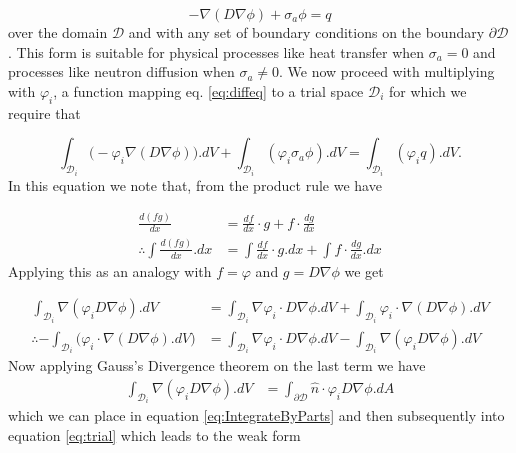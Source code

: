 \documentclass[11pt,letterpaper,titlepage]{article}
\newcommand{\bOmega}{\mathcal{D}}
\numberwithin{equation}{section}
\begin{document}
\begin{equation} \label{eq:diffeq}
-\nabla (D\nabla\phi) + \sigma_a \phi = q
\end{equation}
\newline
\noindent
over the domain $\mathcal{D}$ and with any set of boundary conditions on the boundary $\partial \mathcal{D}$. This form is suitable for physical processes like heat transfer when $\sigma_a = 0$ and processes like neutron diffusion when $\sigma_a \ne 0$.
\newline \newline
We now proceed with multiplying with $\varphi_i$, a function mapping eq. \ref{eq:diffeq} to a trial space $\mathcal{D}_i$ for which we require that

\begin{equation} \label{eq:trial}
\int_{\bOmega_i} \biggr( 
-\varphi_i\nabla (D\nabla\phi) 
\biggr).dV 
+ \int_{\bOmega_i} ( 
\varphi_i\sigma_a  \phi 
  ).dV
= \int_{\bOmega_i} (\varphi_i q).dV.
\end{equation}
\newline
In this equation we note that, from the product rule we have

\begin{align*}
\frac{d(fg)}{dx} &= \frac{df}{dx}\cdot g + f\cdot \frac{dg}{dx} \\
\therefore 
\int \frac{d(fg)}{dx} .dx&= \int \frac{df}{dx}\cdot g.dx + 
\int f\cdot \frac{dg}{dx}.dx
\end{align*}
\newline
Applying this as an analogy with $f=\varphi$ and $g=D\nabla \phi$ we get

\begin{equation}\label{eq:IntegrateByParts}
\begin{aligned}
\int_{\bOmega_i} \nabla( \varphi_i D\nabla \phi) .dV&=
\int_{\bOmega_i} \nabla \varphi_i\cdot D\nabla \phi.dV + 
\int_{\bOmega_i} \varphi_i\cdot \nabla(D\nabla \phi).dV \\
\therefore
-\int_{\bOmega_i} \biggr(
\varphi_i\cdot \nabla(D\nabla \phi).dV
\biggr) &=
\int_{\bOmega_i} \nabla \varphi_i\cdot D\nabla \phi.dV
-\int_{\bOmega_i} \nabla( \varphi_i D\nabla \phi) .dV
\end{aligned}
\end{equation}
\newline
Now applying Gauss's Divergence theorem on the last term we have
\begin{align}\label{eq:GaussDiv}
\int_{\bOmega_i} \nabla( \varphi_i D\nabla \phi) .dV &=
\int_{\partial \bOmega} \hat{n}\cdot \varphi_i D\nabla \phi . dA
\end{align}
\newline
which we can place in equation \ref{eq:IntegrateByParts} and then subsequently into equation \ref{eq:trial} which leads to the weak form
\end{document}
